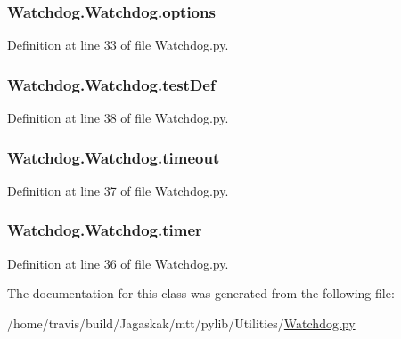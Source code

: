 \hypertarget{classWatchdog_1_1Watchdog_a5ceb06fde29b89623d7a230ae080abe6}{
\subsubsection[{options}]{\setlength{\rightskip}{0pt plus 5cm}Watchdog.\-Watchdog.\-options}}\label{classWatchdog_1_1Watchdog_a5ceb06fde29b89623d7a230ae080abe6}


Definition at line 33 of file Watchdog.\-py.

\hypertarget{classWatchdog_1_1Watchdog_abc547688f9ff2ab9350b028c6f122997}{
\subsubsection[{test\-Def}]{\setlength{\rightskip}{0pt plus 5cm}Watchdog.\-Watchdog.\-test\-Def}}\label{classWatchdog_1_1Watchdog_abc547688f9ff2ab9350b028c6f122997}


Definition at line 38 of file Watchdog.\-py.

\hypertarget{classWatchdog_1_1Watchdog_a62dc7dad113fcda93fe4f8855ac037db}{
\subsubsection[{timeout}]{\setlength{\rightskip}{0pt plus 5cm}Watchdog.\-Watchdog.\-timeout}}\label{classWatchdog_1_1Watchdog_a62dc7dad113fcda93fe4f8855ac037db}


Definition at line 37 of file Watchdog.\-py.

\hypertarget{classWatchdog_1_1Watchdog_ae03efeba550ed8039ab79a8414b8be82}{
\subsubsection[{timer}]{\setlength{\rightskip}{0pt plus 5cm}Watchdog.\-Watchdog.\-timer}}\label{classWatchdog_1_1Watchdog_ae03efeba550ed8039ab79a8414b8be82}


Definition at line 36 of file Watchdog.\-py.



The documentation for this class was generated from the following file\-:\begin{DoxyCompactItemize}
\item 
/home/travis/build/\-Jagaskak/mtt/pylib/\-Utilities/\hyperlink{Watchdog_8py}{Watchdog.\-py}\end{DoxyCompactItemize}
